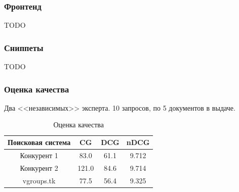 \documentclass{beamer}
\begin{document}
\begin{frame}
  \frametitle{Фронтенд}
    TODO
\end{frame}

\begin{frame}
  \frametitle{Сниппеты}
    TODO
\end{frame}

\begin{frame}
  \frametitle{Оценка качества}
    Два <<независимых>> эксперта. 10 запросов, по 5 документов в выдаче.
    \begin{center}
    \begin{table}[!htb]
      \begin{tabu}{|c|c|c|c|}
        \hline
        Поисковая система & CG    & DCG     & nDCG \\ \hline
        Конкурент 1       & 83.0  &  61.1   & 9.712  \\ \hline
        Конкурент 2       & 121.0 &  84.6   & 9.714   \\ \hline
        vgroups.tk        & 77.5  &  56.4   & 9.325   \\ \hline
      \end{tabu}
    \caption{Оценка качества}
    \end{table}
  \end{center}
\end{frame}
\end{document}

